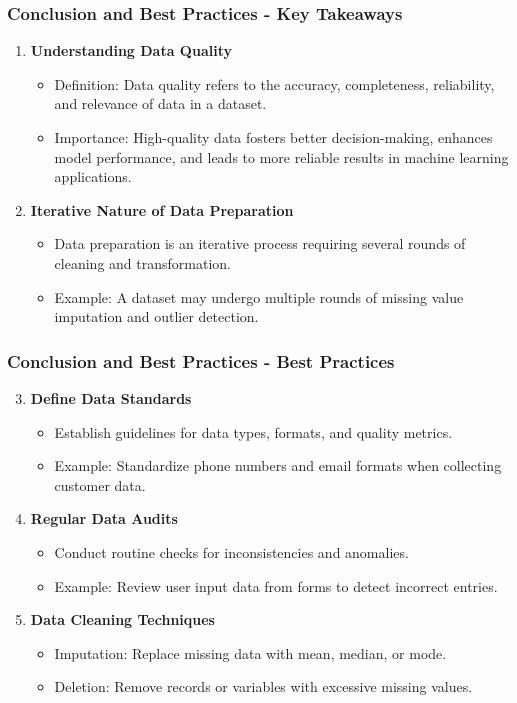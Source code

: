 \documentclass[aspectratio=169]{beamer}
\begin{document}
\begin{frame}[fragile]
  \frametitle{Conclusion and Best Practices - Key Takeaways}

  \begin{enumerate}
    \item \textbf{Understanding Data Quality}
    \begin{itemize}
      \item Definition: Data quality refers to the accuracy, completeness, reliability, and relevance of data in a dataset.
      \item Importance: High-quality data fosters better decision-making, enhances model performance, and leads to more reliable results in machine learning applications.
    \end{itemize}
    
    \item \textbf{Iterative Nature of Data Preparation}
    \begin{itemize}
      \item Data preparation is an iterative process requiring several rounds of cleaning and transformation.
      \item Example: A dataset may undergo multiple rounds of missing value imputation and outlier detection.
    \end{itemize}
  \end{enumerate}
\end{frame}

\begin{frame}[fragile]
  \frametitle{Conclusion and Best Practices - Best Practices}

  \begin{enumerate}
    \setcounter{enumi}{2}
    \item \textbf{Define Data Standards}
    \begin{itemize}
      \item Establish guidelines for data types, formats, and quality metrics.
      \item Example: Standardize phone numbers and email formats when collecting customer data.
    \end{itemize}

    \item \textbf{Regular Data Audits}
    \begin{itemize}
      \item Conduct routine checks for inconsistencies and anomalies.
      \item Example: Review user input data from forms to detect incorrect entries.
    \end{itemize}
    
    \item \textbf{Data Cleaning Techniques}
    \begin{itemize}
      \item Imputation: Replace missing data with mean, median, or mode.
      \item Deletion: Remove records or variables with excessive missing values.
    \end{itemize}
  \end{enumerate}
\end{frame}
\end{document}
